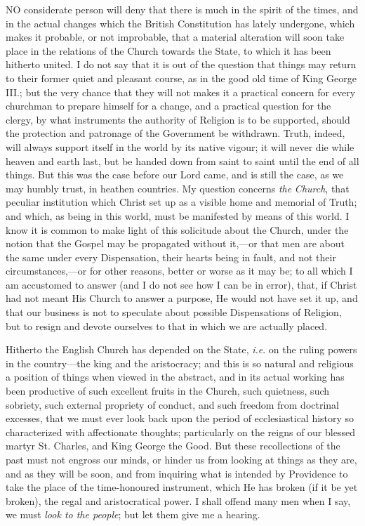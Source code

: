 

NO considerate person will deny that
there is much in the spirit of the times, and in the actual changes
which the British Constitution has lately undergone, which makes it
probable, or not improbable, that a material alteration will soon take
place in the relations of the Church towards the State, to which it
has been hitherto united. I do not say that it is out of the question
that things may return to their former quiet and pleasant course, as
in the good old time of King George III.; but the very chance that
they will not makes it a practical concern for every churchman to
prepare himself for a change, and a practical question for the clergy,
by what instruments the authority of Religion is to be supported,
should the protection and patronage of the Government be withdrawn.
Truth, indeed, will always support itself in the world by its native
vigour; it will never die while heaven and earth last, but be handed
down from saint to saint until the end of all things. But this was the
case before our Lord came, and is still the case, as we may humbly
trust, in heathen countries. My question concerns \emph{the} \emph{Church},
that peculiar institution which Christ set up as a visible home and
memorial of Truth; and which, as being in this world, must be
manifested by means of this world. I know it is common to make light
of this solicitude about the Church, under the notion that the Gospel
may be propagated without it,—or that men are about the same under
every Dispensation, their hearts being in fault, and not their
circumstances,—or for other reasons, better or worse as it may be;
to all which I am accustomed to answer (and I do not see how I can be
in error), that, if Christ had not meant His Church to answer a
purpose, He would not have set it up, and that our business is not to
speculate about possible Dispensations of Religion, but to resign and
devote ourselves to that in which we are actually placed.

Hitherto the English Church has depended on the State, \emph{i.e}. on the
ruling powers in the country—the king and the aristocracy; and this
is so natural and religious a position of things when viewed in the
abstract, and in its actual working has been productive of such
excellent fruits in the Church, such quietness, such sobriety, such
external propriety of conduct, and such freedom from doctrinal
excesses, that we must ever look back upon the period of
ecclesiastical history so characterized with affectionate thoughts;
particularly on the reigns of our blessed martyr St. Charles, and King
George the Good. But these recollections of the past must not engross
our minds, or hinder us from looking at things as they are, and as
they will be soon, and from inquiring what is intended by Providence
to take the place of the time-honoured instrument, which He has broken
(if it be yet broken), the regal and aristocratical power. I shall
offend many men when I say, we must \emph{look to the people}; but let
them give me a hearing.

